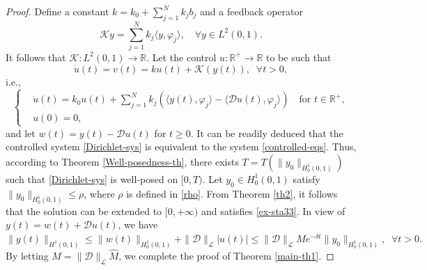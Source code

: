 \documentclass[review]{elsarticle}
\newenvironment{proofof}[1]{%
  \renewcommand{\proofname}{Proof of #1}%
  \begin{proof}%
}{%
  \end{proof}%
}
\numberwithin{equation}{section}
\begin{document}
\begin{proofof}{Theorem \ref{main-th1}}
{Define a constant $k=k_0+\sum_{j=1}^Nk_jb_j$ and a feedback operator
\begin{equation}
    \label{feedback-k}
\mathcal{K}y=\sum_{j=1}^Nk_j \langle y,\varphi_j\rangle,\quad \forall y\in L^2(0,1).
\end{equation}
It follows that $\mathcal{K}:L^2(0,1)\to \mathbb{R}$. Let the control $u:\mathbb{R}^+\to \mathbb{R}$ to be such that
$$\dot{u}(t)=v(t)=ku(t)+\mathcal{K}(y(t)),\;\;\forall t>0,$$ i.e.,
\begin{equation*}
    \label{control-feedback-law}
    \left\{\begin{aligned}
        &\dot{u}(t)=k_0u(t)+\sum_{j=1}^Nk_j \left(\langle y(t),\varphi_j\rangle-\langle\mathcal{D}u(t),\varphi_j\rangle\right)\quad\text{for }t\in\mathbb{R}^+,\\
        &u(0)=0,
    \end{aligned}\right.
\end{equation*}
and let $w(t)=y(t)-\mathcal{D}u(t)$ for $ t\ge 0$. It can be readily deduced that the controlled system \eqref{Dirichlet-sys} is equivalent to the system \eqref{controlled-eqs}.
Thus, according to {Theorem \ref{Well-posedness-th}}, there exists $T=T\left(\|y_0\|_{H^1_0(0,1)}\right)$ such that \eqref{Dirichlet-sys} is well-posed on $[0, T)$. Let $y_0\in H^1_0(0,1)$ satisfy $\|y_0\|_{H^1_0(0,1)}\le \rho$, where $\rho$ is defined in \eqref{rho}. From {Theorem \ref{th2}}, it follows that the solution can be extended to $[0,+\infty)$ and satisfies \eqref{ex-sta33}. In view of $y(t)=w(t)+\mathcal{D}u(t)$, we have
$$\|y(t)\|_{H^1(0,1)}\le\|w(t)\|_{H^1_0(0,1)}+\|\mathcal{D}\|_{\mathcal{L}} |u(t)|\le \|\mathcal{D}\|_{\mathcal{L}}\hat{M}e^{-\delta t}\|y_0\|_{H^1_0(0,1)},\;\;\forall t>0.$$
By letting $M=\|\mathcal{D}\|_{\mathcal{L}}\hat{M}$, we complete the proof of {Theorem \ref{main-th1}}.}
\end{proofof}
\end{document}
